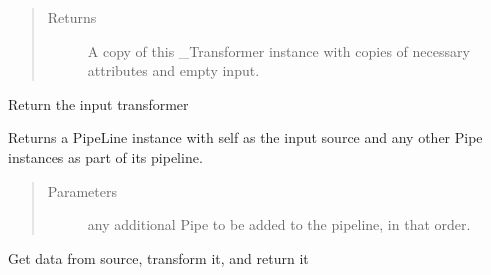 \documentclass[letterpaper,10pt,english]{sphinxmanual}
\begin{document}
\begin{fulllineitems}
\begin{fulllineitems}
\begin{quote}
\begin{description}
\begin{itemize}
\end{itemize}

\item[{Returns}] \leavevmode
A copy of this \_Transformer instance with copies of necessary
attributes and empty input.

\end{description}\end{quote}

\end{fulllineitems}


\begin{fulllineitems}
\label{\detokenize{dalio.pipe:dalio.pipe.pipe.Pipe.get_input}}
Return the input transformer

\end{fulllineitems}


\begin{fulllineitems}
\label{\detokenize{dalio.pipe:dalio.pipe.pipe.Pipe.pipeline}}
Returns a PipeLine instance with self as the input source and any
other Pipe instances as part of its pipeline.
\begin{quote}\begin{description}
\item[{Parameters}] \leavevmode
{} \textendash{} any additional Pipe to be added to the pipeline, in that
order.

\end{description}\end{quote}

\end{fulllineitems}


\begin{fulllineitems}
\label{\detokenize{dalio.pipe:dalio.pipe.pipe.Pipe.run}}
Get data from source, transform it, and return it


\end{fulllineitems}
\end{fulllineitems}
\end{document}

